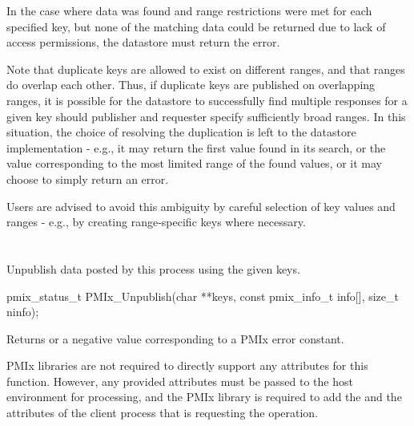 In the case where data was found and range restrictions were met for each specified key, but none of the matching data could be returned due to lack of access permissions, the datastore must return the   error.

\adviceuserstart
Note that duplicate keys are allowed to exist on different ranges, and that ranges do overlap each other. Thus, if duplicate keys are published on overlapping ranges, it is possible for the datastore to successfully find multiple responses for a given key should publisher and requester specify sufficiently broad ranges. In this situation, the choice of resolving the duplication is left to the datastore implementation - e.g., it may return the first value found in its search, or the value corresponding to the most limited range of the found values, or it may choose to simply return an error.

Users are advised to avoid this ambiguity by careful selection of key values and ranges - e.g., by creating range-specific keys where necessary.
\adviceuserend


\section{}

\summary

Unpublish data posted by this process using the given keys.

\format

\cspecificstart
\begin{codepar}
pmix_status_t
PMIx_Unpublish(char **keys,
               const pmix_info_t info[], size_t ninfo);
\end{codepar}
\cspecificend

\begin{arglist}
\end{arglist}

Returns  or a negative value corresponding to a PMIx error constant.

\reqattrstart
\ac{PMIx} libraries are not required to directly support any attributes for this function. However, any provided attributes must be passed to the host environment for processing, and the \ac{PMIx} library is required to add the  and the  attributes of the client process that is requesting the operation.

